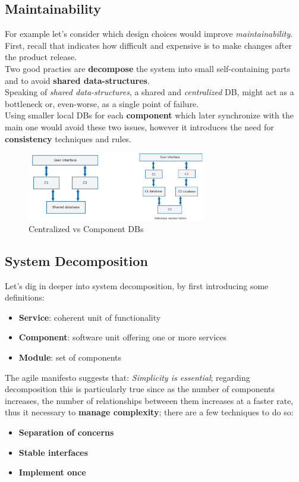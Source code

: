 \subsection{Maintainability}
For example let's consider which design choices would improve \textit{maintainability}.
First, recall that indicates how difficult and expensive is to make changes after the product release.\\
Two good practies are \textbf{decompose} the system into small self-containing parts and to avoid \textbf{shared data-structures}.\\
Speaking of \textit{shared data-structures},
a shared and \textit{centralized} DB, might act as a bottleneck or, even-worse,
as a single point of failure.\\
Using smaller local DBs for each \textbf{component} which later synchronize with the main one would avoid these two issues,
however it introduces the need for \textbf{consistency} techniques and rules.
\begin{figure}[h]
    \centering
    \includegraphics[width=0.7\textwidth]{images/component_DBs.png}
    \caption{Centralized vs Component DBs}
\end{figure}

\subsection{System Decomposition}
Let's dig in deeper into system decomposition, by first introducing some definitions:
\begin{itemize}
    \item \textbf{Service}: coherent unit of functionality
    \item \textbf{Component}: software unit offering one or more services
    \item \textbf{Module}: set of components
\end{itemize}
The agile manifesto suggests that: \textit{Simplicity is essential};
regarding decomposition this is particularly true since as the number of components increases,
the number of relationships betweeen them increases at a faster rate,
thus it necessary to \textbf{manage complexity};
there are a few techniques to do so:
\begin{itemize}
    \item \textbf{Separation of concerns}
    \item \textbf{Stable interfaces}
    \item \textbf{Implement once}
\end{itemize}

